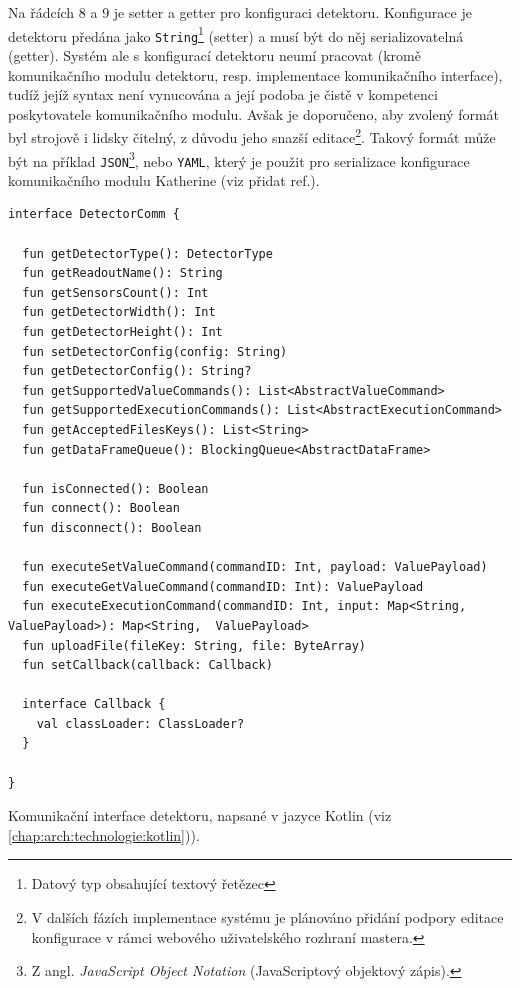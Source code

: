Na řádcích 8 a 9 je setter a getter pro konfiguraci detektoru. Konfigurace je detektoru předána jako \texttt{String}\footnote{Datový typ obsahující textový řetězec} (setter) a musí být do něj serializovatelná (getter). Systém ale s konfigurací detektoru neumí pracovat (kromě komunikačního modulu detektoru, resp. implementace komunikačního interface), tudíž jejíž syntax není vynucována a její podoba je čistě v kompetenci poskytovatele komunikačního modulu. Avšak je doporučeno, aby zvolený formát byl strojově i lidsky čitelný, z důvodu jeho snazší editace\footnote{V dalších fázích implementace systému je plánováno přidání podpory editace konfigurace v rámci webového uživatelského rozhraní mastera.}. Takový formát může být na příklad \texttt{JSON}\footnote{Z angl. \textit{JavaScript Object Notation} (JavaScriptový objektový zápis).}, nebo \texttt{YAML}, který je použit pro serializace konfigurace komunikačního modulu Katherine (viz \todo přidat ref.).

\begin{code}[h!]
\begin{verbatim}
interface DetectorComm {

  fun getDetectorType(): DetectorType
  fun getReadoutName(): String
  fun getSensorsCount(): Int
  fun getDetectorWidth(): Int
  fun getDetectorHeight(): Int
  fun setDetectorConfig(config: String)
  fun getDetectorConfig(): String?
  fun getSupportedValueCommands(): List<AbstractValueCommand>
  fun getSupportedExecutionCommands(): List<AbstractExecutionCommand>
  fun getAcceptedFilesKeys(): List<String>
  fun getDataFrameQueue(): BlockingQueue<AbstractDataFrame>
  
  fun isConnected(): Boolean
  fun connect(): Boolean
  fun disconnect(): Boolean
  
  fun executeSetValueCommand(commandID: Int, payload: ValuePayload)
  fun executeGetValueCommand(commandID: Int): ValuePayload
  fun executeExecutionCommand(commandID: Int, input: Map<String, ValuePayload>): Map<String,  ValuePayload>
  fun uploadFile(fileKey: String, file: ByteArray)
  fun setCallback(callback: Callback)
  
  interface Callback {
    val classLoader: ClassLoader?
  }

}
\end{verbatim}
\caption{Komunikační interface detektoru, napsané v jazyce Kotlin (viz \ref{chap:arch:technologie:kotlin})).}
\label{src:handler:comm_intf}
\end{code}

